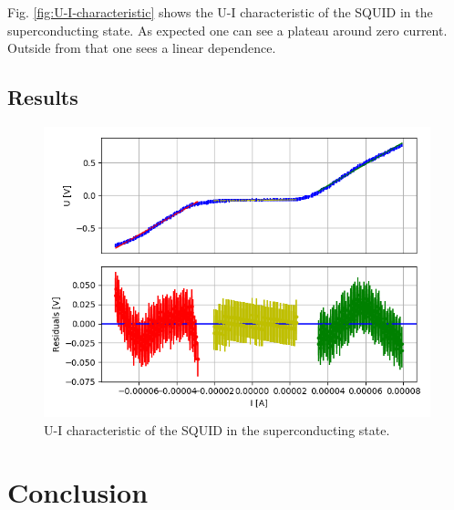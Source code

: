 \documentclass[12pt,a4paper]{article}
\begin{document}
Fig. \ref{fig:U-I-characteristic} shows the U-I characteristic of the SQUID in the superconducting state. As expected one can see a plateau around zero current. Outside from that one sees a linear dependence.

\subsection{Results}

\begin{figure} [H]
\centering
\includegraphics[scale=0.8]{Bilder/U_I_characteristic/fit_43.PNG}
\caption{U-I characteristic of the SQUID in the superconducting state.}
\label{fig:U-I-characteristic_fit}
\end{figure}




\section{Conclusion}
\end{document}
